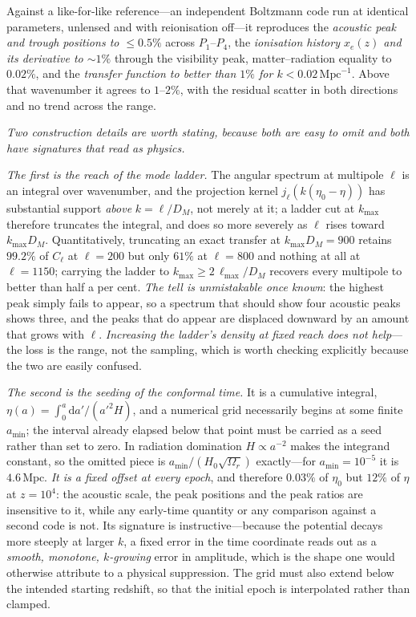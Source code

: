 \documentclass[11pt,a4paper]{article}
\theoremstyle{plain}
\theoremstyle{definition}
\theoremstyle{remark}
\newcommand{\dd}{\mathrm{d}}   %
\begin{document}
Against a like-for-like reference---an independent Boltzmann code run at identical parameters, unlensed and with reionisation off---it reproduces the \emph{acoustic peak and trough positions to $\le0.5\%$} across $P_1$--$P_4$, the \emph{ionisation history $x_e(z)$ and its derivative to $\sim\!1\%$} through the visibility peak, matter--radiation equality to $0.02\%$, and the \emph{transfer function to better than $1\%$ for $k<0.02\,\mathrm{Mpc}^{-1}$}. Above that wavenumber it agrees to $1$--$2\%$, with the residual scatter in both directions and no trend across the range.

\emph{Two construction details are worth stating, because both are easy to omit and both have signatures that read as physics.}

\emph{The first is the reach of the mode ladder.} The angular spectrum at multipole $\ell$ is an integral over wavenumber, and the projection kernel $j_\ell(k(\eta_0-\eta))$ has substantial support \emph{above} $k=\ell/D_M$, not merely at it; a ladder cut at $k_{\max}$ therefore truncates the integral, and does so more severely as $\ell$ rises toward $k_{\max}D_M$. Quantitatively, truncating an exact transfer at $k_{\max}D_M=900$ retains $99.2\%$ of $C_\ell$ at $\ell=200$ but only $61\%$ at $\ell=800$ and nothing at all at $\ell=1150$; carrying the ladder to $k_{\max}\ge2\,\ell_{\max}/D_M$ recovers every multipole to better than half a per cent. \emph{The tell is unmistakable once known}: the highest peak simply fails to appear, so a spectrum that should show four acoustic peaks shows three, and the peaks that do appear are displaced downward by an amount that grows with $\ell$. \emph{Increasing the ladder's density at fixed reach does not help}---the loss is the range, not the sampling, which is worth checking explicitly because the two are easily confused.

\emph{The second is the seeding of the conformal time.} It is a cumulative integral, $\eta(a)=\int_{0}^{a}\dd a'/(a'^{2}H)$, and a numerical grid necessarily begins at some finite $a_{\min}$; the interval already elapsed below that point must be carried as a seed rather than set to zero. In radiation domination $H\propto a^{-2}$ makes the integrand constant, so the omitted piece is $a_{\min}/(H_{0}\sqrt{\Omega_{r}})$ exactly---for $a_{\min}=10^{-5}$ it is $4.6\,\mathrm{Mpc}$. \emph{It is a fixed offset at every epoch}, and therefore $0.03\%$ of $\eta_{0}$ but $12\%$ of $\eta$ at $z=10^{4}$: the acoustic scale, the peak positions and the peak ratios are insensitive to it, while any early-time quantity or any comparison against a second code is not. Its signature is instructive---because the potential decays more steeply at larger $k$, a fixed error in the time coordinate reads out as a \emph{smooth, monotone, $k$-growing} error in amplitude, which is the shape one would otherwise attribute to a physical suppression. The grid must also extend below the intended starting redshift, so that the initial epoch is interpolated rather than clamped.
\end{document}
